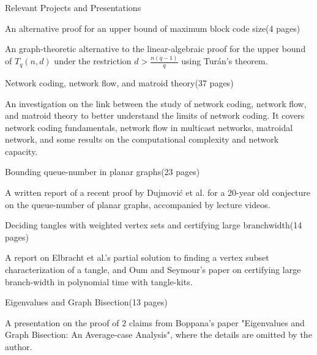 \documentclass{cv}
\begin{document}
\begin{rSection}{Relevant Projects and Presentations}
\begin{rSubsection}{An alternative proof for an upper bound of maximum block code size}{(4 pages)}{}{}
	\item An graph-theoretic alternative to the linear-algebraic proof for the upper bound of $T_q(n,d)$ under 
	the restriction $d > \frac{n(q-1)}{q}$ using Tur\'{a}n's theorem.
\end{rSubsection}
	
\begin{rSubsection}{Network coding, network flow, and matroid theory}{(37 pages)}{}{}
	\item An investigation on the link between the study of network coding, network flow, and matroid theory 
	to better understand the limits of network coding. It covers network coding fundamentals, network flow in 
	multicast networks, matroidal network, and some results on the computational complexity and network capacity.
\end{rSubsection}

\begin{rSubsection}{Bounding queue-number in planar graphs}{(23 pages)}{}{}
	\item A written report of a recent proof by Dujmovi\'{c} et al. for a 20-year old conjecture on the queue-number of planar graphs, 
	accompanied by lecture videos.
\end{rSubsection}

\begin{rSubsection}{Deciding tangles with weighted vertex sets and certifying large branchwidth}{(14 pages)}{}{}
	\item A report on Elbracht et al.'s partial solution to finding a vertex subset characterization of a tangle, and Oum and 
	Seymour's paper on certifying large branch-width in polynomial time with tangle-kits.
\end{rSubsection}

\begin{rSubsection}{Eigenvalues and Graph Bisection}{(13 pages)}{}{}
	\item A presentation on the proof of $2$ claims from Boppana's paper "Eigenvalues and Graph Bisection: An Average-case Analysis", 
	where the details are omitted by the author.
\end{rSubsection}
\end{rSection}
\end{document}
